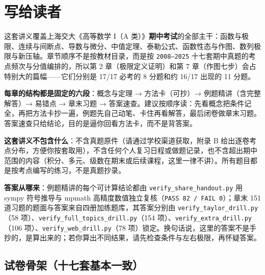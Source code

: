 \newpage
\section*{写给读者}

\noindent 这套讲义覆盖上海交大《高等数学 I（A 类）》\textbf{期中考试}的全部主干：函数与极限、连续与间断点、导数与微分、中值定理、泰勒公式、函数性态与作图、数列极限与新压轴。章节顺序不是按教材目录，而是按 \texttt{2008--2025} 十七套期中真题的考点频次与分值编排的，所以第 2 章（极限定义证明）和第 7 章（作图七步）会占特别大的篇幅——它们分别是 17/17 必考的 8 分题和约 16/17 出现的 11 分题。

\bigskip
\noindent\textbf{每章的结构都是固定的六段}：概念与定理 → 方法卡（可抄）→ 例题精讲（含完整解答）→ 易错点 → 章末习题 → 答案速查。建议按顺序读：先看概念把条件记全，再把方法卡抄一遍，例题先自己动笔、卡住再看解答，最后闭卷做章末习题。答案速查只给结论，目的是逼你回看方法卡，而不是背答案。

\bigskip
\noindent\textbf{这套讲义不包含什么}：不含真题原件（请通过学校渠道获取，附录 B 给出逐卷考点分布，方便你按套取用），不含任何个人复习日程或做题记录，也不含超出期中范围的内容（积分、多元、级数在期末或后续课程，这里一律不讲）。所有题目都是按考点编写的练习，不是真题抄录。

\bigskip
\noindent\textbf{答案从哪来}：例题精讲的每个可计算结论都由 \texttt{verify\_share\_handout.py} 用 sympy 符号推导与 mpmath 高精度数值独立复核（\texttt{PASS 82 / FAIL 0}）；章末 151 道习题的题面与答案来自四册加练题库，其答案分别由 \texttt{verify\_taylor\_drill.py}（58 项）、\texttt{verify\_full\_topics\_drill.py}（154 项）、\texttt{verify\_extra\_drill.py}（106 项）、\texttt{verify\_web\_drill.py}（78 项）锁定。换句话说，这里的答案不是手抄的，是算出来的；若你算出不同结果，请先检查条件与左右极限，再怀疑答案。

\subsection*{试卷骨架（十七套基本一致）}

